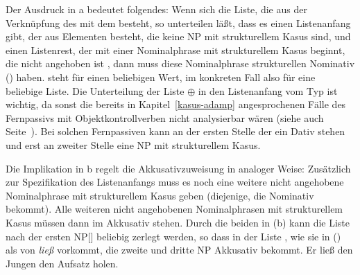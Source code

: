 {\noindent
Der Ausdruck in a bedeutet folgendes: Wenn sich die Liste, die aus der Verknüpfung des \subjwes
mit dem \compsw besteht, so unterteilen läßt, dass es einen Listenanfang gibt, der aus Elementen besteht,
die keine NP mit strukturellem Kasus sind, und einen Listenrest, der mit einer Nominalphrase mit strukturellem
Kasus beginnt, die nicht angehoben ist , dann muss diese Nominalphrase strukturellen
Nominativ () haben. \etag steht für einen beliebigen Wert, im konkreten Fall also für eine beliebige Liste.
Die Unterteilung der Liste  $\oplus$  in den Listenanfang vom Typ 
ist wichtig, da sonst die bereits in Kapitel~\ref{kasus-adamp} angesprochenen Fälle des Fernpassivs mit Objektkontrollverben
nicht analysierbar wären (siehe auch Seite~\pageref{page-remote-passive-erlauben}). Bei solchen
Fernpassiven kann an der ersten Stelle der \compsl ein Dativ stehen und erst an zweiter Stelle eine
NP mit strukturellem Kasus.

Die Implikation in b regelt die Akkusativzuweisung in analoger Weise: Zusätzlich
zur Spezifikation des Listenanfangs muss es noch eine weitere nicht angehobene
Nominalphrase mit strukturellem Kasus geben (diejenige, die Nominativ bekommt). Alle weiteren
nicht angehobenen Nominalphrasen mit strukturellem Kasus  müssen dann im Akkusativ stehen.
Durch die beiden \etag in (b) kann die Liste nach der ersten NP[\str] beliebig zerlegt werden,
so dass \zb in der Liste , wie sie in () als \compsl
von \emph{ließ} vorkommt, die zweite und dritte NP Akkusativ bekommt.
\ea
Er ließ den Jungen den Aufsatz holen.
\z






}
